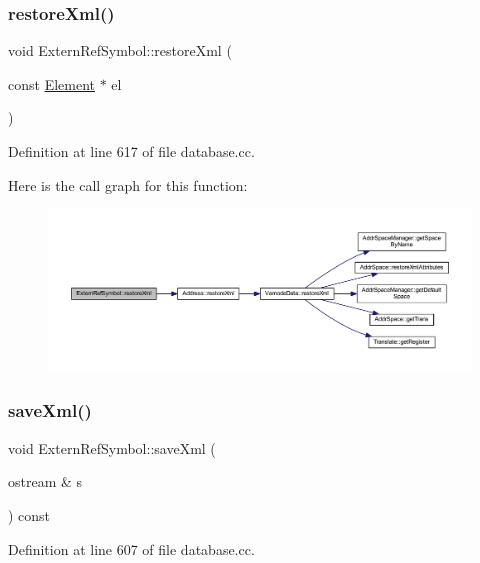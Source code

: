 \subsubsection{\texorpdfstring{restoreXml()}{restoreXml()}}
{\footnotesize\ttfamily void Extern\+Ref\+Symbol\+::restore\+Xml (\begin{DoxyParamCaption}\item[{const \mbox{\hyperlink{class_element}{Element}} $\ast$}]{el }\end{DoxyParamCaption})\hspace{0.3cm}{\ttfamily [virtual]}}



Definition at line 617 of file database.\+cc.

Here is the call graph for this function\+:
\nopagebreak
\begin{figure}[H]
\begin{center}
\leavevmode
\includegraphics[width=350pt]{class_extern_ref_symbol_a84cae4cba0ca0ec757c93c63cd55921e_cgraph}
\end{center}
\end{figure}
\mbox{\label{class_extern_ref_symbol_aaff9d3efb4a2594f857799db35eddc1d}} 
\subsubsection{\texorpdfstring{saveXml()}{saveXml()}}
{\footnotesize\ttfamily void Extern\+Ref\+Symbol\+::save\+Xml (\begin{DoxyParamCaption}\item[{ostream \&}]{s }\end{DoxyParamCaption}) const\hspace{0.3cm}{\ttfamily [virtual]}}



Definition at line 607 of file database.\+cc.


